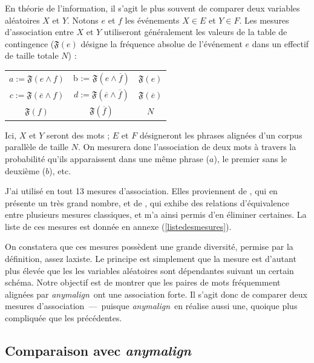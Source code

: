 \documentclass[a4paper,10pt]{article}
\newcommand{\anym}{\emph{anymalign}}
\begin{document}
En théorie de l'information, il s'agit le plus souvent de comparer deux variables aléatoires $X$ et $Y$. Notons $e$ et $f$ les événements $X \in E$ et $Y \in F$. Les mesures d'association entre $X$ et $Y$ utiliseront généralement les valeurs de la table de contingence ($\mathfrak{F}(e)$ désigne la fréquence absolue de l'événement $e$ dans un effectif de taille totale $N$) :

\begin{tabular}{|cc|c|}
\hline
$a := \mathfrak{F}(e\wedge f)$ & b := $\mathfrak{F}(e\wedge\overline{f})$ & $\mathfrak{F}(e)$ \\
$c := \mathfrak{F}(\overline{e}\wedge f)$ & $d := \mathfrak{F}(\overline{e}\wedge\overline{f})$ & $\mathfrak{F}(\overline{e})$ \\
\hline
$\mathfrak{F}(f)$ & $\mathfrak{F}(\overline{f})$ & $N$ \\
\hline
\end{tabular}

Ici, $X$ et $Y$ seront des mots ; $E$ et $F$ désigneront les phrases alignées d'un corpus parallèle de taille $N$. On mesurera donc l'association de deux mots à travers la probabilité qu'ils apparaissent dans une même phrase ($a$), le premier sans le deuxième ($b$), etc.

J'ai utilisé en tout 13 mesures d'association. Elles proviennent de \cite{pecina2006combining}, qui en présente un très grand nombre, et de \cite{hoang2009re}, qui exhibe des relations d'équivalence entre plusieurs mesures classiques, et m'a ainsi permis d'en éliminer certaines. La liste de ces  mesures est donnée en annexe (\ref{listedesmesures}).

On constatera que ces mesures possèdent une grande diversité, permise par la définition, assez laxiste. Le principe est simplement que la mesure est d'autant plus élevée que les les variables aléatoires sont dépendantes suivant un certain schéma. Notre objectif est de montrer que les paires de mots fréquemment alignées par \anym~ont une association forte. Il s'agit donc de comparer deux mesures d'association~---~puisque \anym~en réalise aussi une, quoique plus compliquée que les précédentes.


\subsection{Comparaison avec \anym}
\end{document}
